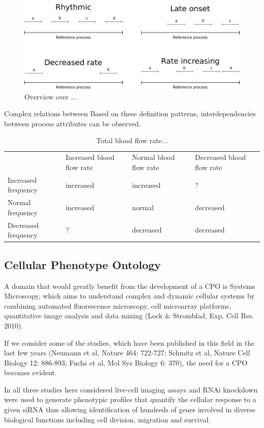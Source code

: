 \documentclass{bioinfo}
\begin{document}
\begin{figure}
  \centering
  \includegraphics[width=.5\textwidth]{processpatterns.pdf}
  \caption{Overview over ...\label{fig:patterns}}
\end{figure}

Complex relations between Based on these definition patterns,
interdependencies between process attributes can be observed.

\begin{table}
  \begin{tabular}{l|l|l|l}
    & Increased blood flow rate & Normal blood flow rate & Decreased
    blood flow rate \\
    Increased frequency &increased&increased&?\\
    Normal frequency &increased&normal&decreased\\
    Decreased frequency &?&decreased&decreased
  \end{tabular}
  \caption{\label{...}Total blood flow rate...}
\end{table}


\subsection{Cellular Phenotype Ontology}

A domain that would greatly benefit from the development of a CPO is
Systems Microscopy, which aims to understand complex and dynamic
cellular systems by combining automated fluorescence microscopy, cell
microarray platforms, quantitative image analysis and data mining
(Lock \& Stromblad, Exp. Cell Res. 2010).

If we consider some of the studies, which have been published in this
field in the last few years (Neumann et al, Nature 464: 722-727;
Schmitz et al, Nature Cell Biology 12: 886-893; Fuchs et al, Mol Sys
Biology 6: 370), the need for a CPO becomes evident.

In all three studies here considered live-cell imaging assays and RNAi
knockdown were used to generate phenotypic profiles that quantify the
cellular response to a given siRNA thus allowing identification of
hundreds of genes involved in diverse biological functions including
cell division, migration and survival.
\end{document}
